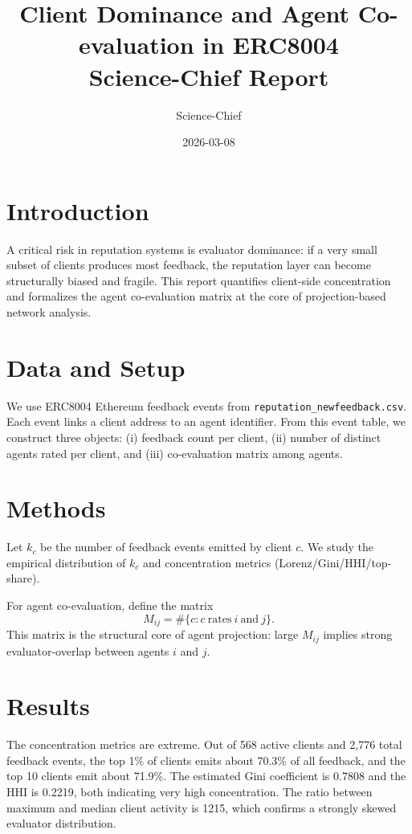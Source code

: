 \documentclass[11pt,a4paper]{article}
\title{Client Dominance and Agent Co-evaluation in ERC8004\\Science-Chief Report}
\author{Science-Chief}
\date{2026-03-08}
\begin{document}
\maketitle

\section*{Introduction}
A critical risk in reputation systems is evaluator dominance: if a very small subset of clients produces most feedback, the reputation layer can become structurally biased and fragile. This report quantifies client-side concentration and formalizes the agent co-evaluation matrix at the core of projection-based network analysis.

\section*{Data and Setup}
We use ERC8004 Ethereum feedback events from \texttt{reputation\_newfeedback.csv}. Each event links a client address to an agent identifier. From this event table, we construct three objects: (i) feedback count per client, (ii) number of distinct agents rated per client, and (iii) co-evaluation matrix among agents.

\section*{Methods}
Let $k_c$ be the number of feedback events emitted by client $c$. We study the empirical distribution of $k_c$ and concentration metrics (Lorenz/Gini/HHI/top-share).

For agent co-evaluation, define the matrix
\[
M_{ij} = \#\{c: c\ \mathrm{rates}\ i\ \mathrm{and}\ j\}.
\]
This matrix is the structural core of agent projection: large $M_{ij}$ implies strong evaluator-overlap between agents $i$ and $j$.

\section*{Results}
The concentration metrics are extreme. Out of 568 active clients and 2,776 total feedback events, the top 1\% of clients emits about 70.3\% of all feedback, and the top 10 clients emit about 71.9\%. The estimated Gini coefficient is 0.7808 and the HHI is 0.2219, both indicating very high concentration. The ratio between maximum and median client activity is 1215, which confirms a strongly skewed evaluator distribution.
\end{document}
